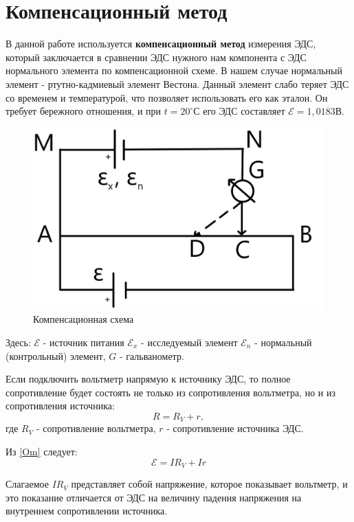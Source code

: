 \documentclass[a4paper,12pt]{article}
\begin{document}
\section{Компенсационный метод}
В данной работе используется \textbf{компенсационный метод} измерения ЭДС, который заключается в сравнении ЭДС нужного нам компонента с ЭДС нормального элемента по компенсационной схеме. В нашем случае нормальный элемент - ртутно-кадмиевый элемент Вестона. Данный элемент слабо теряет ЭДС со временем и температурой, что позволяет использовать его как эталон. Он требует бережного отношения, и при $t = 20^{\circ}С$ его ЭДС составляет $\mathcal{E} = 1,0183 В$.

\begin{figure}[!h]
	\begin{center}
		\includegraphics[scale=0.3]{scheme-1}
	\end{center}
	\caption{Компенсационная схема}
\end{figure}

Здесь: $\mathcal{E}$ - источник питания $\mathcal{E}_x$ - исследуемый элемент $\mathcal{E}_n$ - нормальный (контрольный) элемент, $G$ - гальванометр.  

Если подключить вольтметр напрямую к источнику ЭДС, то полное сопротивление будет состоять не только из сопротивления вольтметра, но и из сопротивления источника:
$$R = R_V + r,$$
где $R_V$ - сопротивление вольтметра, $r$ - сопротивление источника ЭДС.

Из \eqref{Om} следует:
\begin{equation}
	\mathcal{E} = IR_V + Ir
\end{equation}

Слагаемое $IR_V$ представляет собой напряжение, которое показывает вольтметр, и это показание отличается от ЭДС на величину падения напряжения на внутреннем сопротивлении источника.
\end{document}
